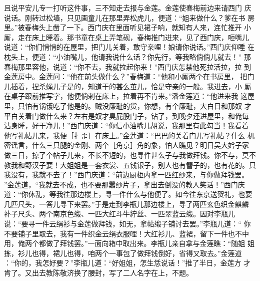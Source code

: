 且说平安儿专一打听这件事，三不知走去报与金莲。金莲使春梅前边来请西门
庆说话。刚转过松墙，只见画童儿在那里弄松虎儿，便道：“姐来做什么？爹在书
房里。”被春梅头上凿了一下。西门庆在里面听见裙子响，就知有人来，连忙推开
小厮，走在床上睡着。那书童在桌上弄笔砚，春梅推门进来，见了西门庆，咂嘴儿
说道：“你们悄悄的在屋里，把门儿关着，敢守亲哩！娘请你说话。”西门庆仰睡
在枕头上，便道：“小油嘴儿，他请我说什么话？你先行，等我略倘倘儿就去！”
那春梅那里容他，说道：“你不去，我就拉起你来！”西门庆怎禁他死拉活拉，拉
到金莲房中。金莲问：“他在前头做什么？”春梅道：“他和小厮两个在书房里，
把门儿插着，捏杀蝇儿子是的，知道干的甚么茧儿，恰是守亲的一般。我进去，小
厮在桌子跟前推写字，他便倘剌在床上，拉着再不肯来。”潘金莲道：“他进来我
这屋里，只怕有锅镬吃了他是的。贼没廉耻的货，你想，有个廉耻，大白日和那奴
才平白关着门做什么来？左右是奴才臭屁股门子，钻了，到晚夕还进屋里，和俺每
沾身睡，好干净儿！”西门庆道：“你信小油嘴儿胡说，我那里有此勾当！我看着
他写礼帖儿来，我便［扌歪］在床上。”金莲道：“巴巴的关着门儿写礼帖？什么
机密谣言，什么三只腿的金刚、两个［角京］角的象，怕人瞧见？明日吴大妗子家
做三日，掠了个帖子儿来，不长不短的，也寻件甚么子与我做拜钱。你不与，莫不
教我和野汉子要！大姐姐是一套衣裳、五钱银子，别人也有簪子的，也有花的。只
我没有，我就不去了！”西门庆道：“前边厨柜内拿一匹红纱来，与你做拜钱罢。
”金莲道，“我就去不成，也不要那嚣纱片子，拿出去倒没的教人笑话！”西门庆
道：“你休乱，等我往那边楼上，寻一件什么与他便了。如今往东京送贺礼，也要
几匹尺头，一答儿寻下来罢。”于是走到李瓶儿那边楼上，寻了两匹玄色织金麒麟
补子尺头、两个南京色缎、一匹大红斗牛紵丝、一匹翠蓝云缎。因对李瓶儿
说：“要寻一件云绢衫与金莲做拜钱，如无，拿帖缎子铺讨去罢。”李瓶儿道：“
你不要铺子里取去，我有一件织金云绢衣服哩！大红衫儿、蓝裙，留下一件也不中
用，俺两个都做了拜钱罢。”一面向箱中取出来。李瓶儿亲自拿与金莲瞧：“随姐
姐拣，衫儿也得，裙儿也得，咱两个一事包了做拜钱倒好，省得又取去。”金莲道
：“你的，我怎好要？”李瓶儿道：“好姐姐，怎生恁说话！”推了半日，金莲方
才肯了。又出去教陈敬济换了腰封，写了二人名字在上，不题。


